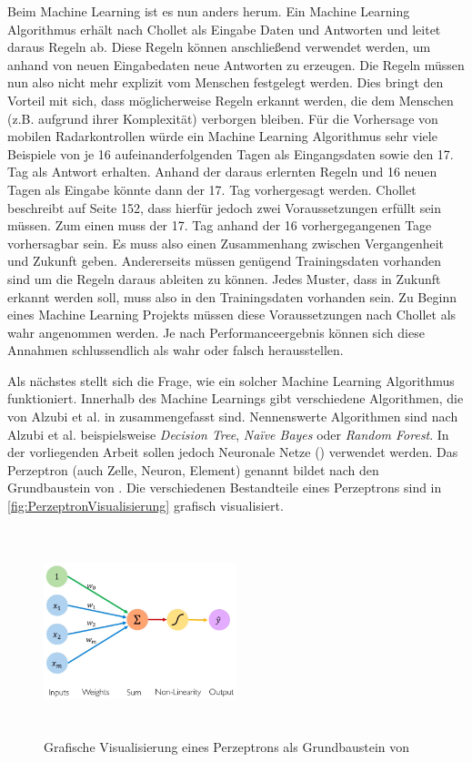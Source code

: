 Beim Machine Learning ist es nun anders herum.
Ein Machine Learning Algorithmus erhält nach Chollet als Eingabe Daten und Antworten und leitet daraus Regeln ab.
Diese Regeln können anschließend verwendet werden, um anhand von neuen Eingabedaten neue Antworten zu erzeugen.
Die Regeln müssen nun also nicht mehr explizit vom Menschen festgelegt werden.
Dies bringt den Vorteil mit sich, dass möglicherweise Regeln erkannt werden, die dem Menschen (z.B. aufgrund ihrer Komplexität) verborgen bleiben.
Für die Vorhersage von mobilen Radarkontrollen würde ein Machine Learning Algorithmus sehr viele Beispiele von je 16 aufeinanderfolgenden Tagen als Eingangsdaten sowie den 17. Tag als Antwort erhalten.
Anhand der daraus erlernten Regeln und 16 neuen Tagen als Eingabe könnte dann der 17. Tag vorhergesagt werden.
Chollet beschreibt auf Seite 152, dass hierfür jedoch zwei Voraussetzungen erfüllt sein müssen.
Zum einen muss der 17. Tag anhand der 16 vorhergegangenen Tage vorhersagbar sein.
Es muss also einen Zusammenhang zwischen Vergangenheit und Zukunft geben.
Andererseits müssen genügend Trainingsdaten vorhanden sind um die Regeln daraus ableiten zu können.
Jedes Muster, dass in Zukunft erkannt werden soll, muss also in den Trainingsdaten vorhanden sein.
Zu Beginn eines Machine Learning Projekts müssen diese Voraussetzungen nach Chollet als wahr angenommen werden.
Je nach Performanceergebnis können sich diese Annahmen schlussendlich als wahr oder falsch herausstellen.

Als nächstes stellt sich die Frage, wie ein solcher Machine Learning Algorithmus funktioniert.
Innerhalb des Machine Learnings gibt verschiedene Algorithmen, die von Alzubi et al. in \cite{MachineLearningOverview} zusammengefasst sind.
Nennenswerte Algorithmen sind nach Alzubi et al. beispielsweise \emph{Decision Tree}, \emph{Na\"ive Bayes} oder \emph{Random Forest}.
In der vorliegenden Arbeit sollen jedoch Neuronale Netze () verwendet werden.
Das Perzeptron (auch Zelle, Neuron, Element) genannt bildet nach \cite{6S191Intro} den Grundbaustein von .
Die verschiedenen Bestandteile eines Perzeptrons sind in \autoref{fig:PerzeptronVisualisierung} grafisch visualisiert.

\begin{figure}[h]
    \centering
    \includegraphics[width=0.5\textwidth,height=6cm,keepaspectratio=true]{content/images/PerzeptronVisualisierung.png}
    \caption{Grafische Visualisierung eines Perzeptrons als Grundbaustein von  \cite{6S191Intro}}
    \label{fig:PerzeptronVisualisierung}
\end{figure}

